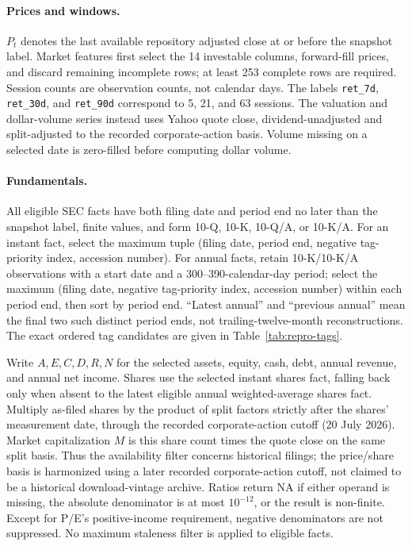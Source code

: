 \paragraph{Prices and windows.}
$P_t$ denotes the last available repository adjusted close at or before
the snapshot label. Market features first select the 14 investable
columns, forward-fill prices, and discard remaining incomplete rows;
at least 253 complete rows are required. Session counts are observation
counts, not calendar days. The labels \texttt{ret\_7d}, \texttt{ret\_30d},
and \texttt{ret\_90d} correspond to 5, 21, and 63 sessions. The valuation
and dollar-volume series instead uses Yahoo quote close, dividend-unadjusted
and split-adjusted to the recorded corporate-action basis. Volume missing
on a selected date is zero-filled before computing dollar volume.

\paragraph{Fundamentals.}
All eligible SEC facts have both filing date and period end no later than
the snapshot label, finite values, and form 10-Q, 10-K, 10-Q/A, or 10-K/A.
For an instant fact, select the maximum tuple (filing date, period end,
negative tag-priority index, accession number). For annual facts, retain
10-K/10-K/A observations with a start date and a 300--390-calendar-day
period; select the maximum (filing date, negative tag-priority index,
accession number) within each period end, then sort by period end.
``Latest annual'' and ``previous annual'' mean the final two such distinct
period ends, not trailing-twelve-month reconstructions. The exact ordered
tag candidates are given in Table~\ref{tab:repro-tags}.

Write $A,E,C,D,R,N$ for the selected assets, equity, cash, debt, annual
revenue, and annual net income. Shares use the selected instant shares
fact, falling back only when absent to the latest eligible annual
weighted-average shares fact. Multiply as-filed shares by the product
of split factors strictly after the shares' measurement date, through
the recorded corporate-action cutoff (20 July 2026). Market capitalization
$M$ is this share count times the quote close on the same split basis.
Thus the availability filter concerns historical filings; the price/share
basis is harmonized using a later recorded corporate-action cutoff,
not claimed to be a historical download-vintage archive.
Ratios return NA if either operand is missing, the absolute denominator
is at most $10^{-12}$, or the result is non-finite. Except for P/E's
positive-income requirement, negative denominators are not suppressed.
No maximum staleness filter is applied to eligible facts.

